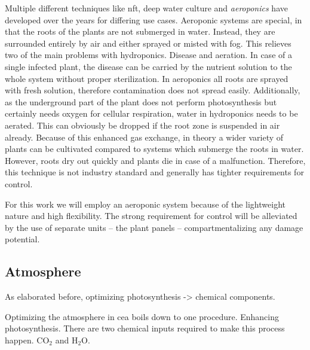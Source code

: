 Multiple different techniques like \ac{nft}, deep water culture and \textit{aeroponics} have developed over the years for differing use cases.
Aeroponic systems are special, in that the roots of the plants are not submerged in water.
Instead, they are surrounded entirely by air and either sprayed or misted with fog.
This relieves two of the main problems with hydroponics.
Disease and aeration.
In case of a single infected plant, the disease can be carried by the nutrient solution to the whole system without proper sterilization.
In aeroponics all roots are sprayed with fresh solution, therefore contamination does not spread easily.
Additionally, as the underground part of the plant does not perform photosynthesis but certainly needs oxygen for cellular respiration, water in hydroponics needs to be aerated.
This can obviously be dropped if the root zone is suspended in air already.
Because of this enhanced gas exchange, in theory a wider variety of plants can be cultivated compared to systems which submerge the roots in water.
However, roots dry out quickly and plants die in case of a malfunction.
Therefore, this technique is not industry standard and generally has tighter requirements for control.

For this work we will employ an aeroponic system because of the lightweight nature and high flexibility.
The strong requirement for control will be alleviated by the use of separate units -- the plant panels -- compartmentalizing any damage potential.




\subsection{Atmosphere}
As elaborated before, optimizing photosynthesis -> chemical components.

Optimizing the atmosphere in \ac{cea} boils down to one procedure.
Enhancing photosynthesis.
There are two chemical inputs required to make this process happen.
CO$_2$ and H$_2$O.

